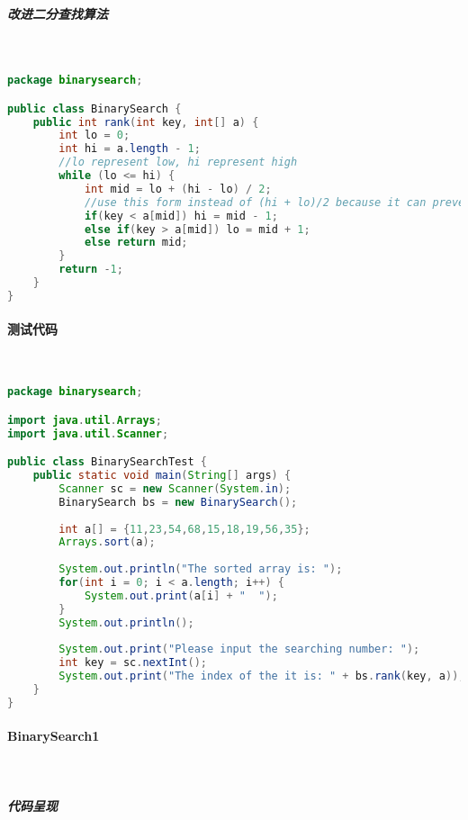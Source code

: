\documentclass[UTF8]{ctexart}
\begin{document}
    \subparagraph{改进二分查找算法}

    ~

\begin{small}
\begin{lstlisting}[language=java]
package binarysearch;

public class BinarySearch {
	public int rank(int key, int[] a) {
        int lo = 0;
        int hi = a.length - 1;
        //lo represent low, hi represent high
        while (lo <= hi) {
            int mid = lo + (hi - lo) / 2;
            //use this form instead of (hi + lo)/2 because it can prevent overflow
            if(key < a[mid]) hi = mid - 1;
            else if(key > a[mid]) lo = mid + 1;
            else return mid;
        }
        return -1;
    }
}
\end{lstlisting}
\end{small}

    \paragraph{测试代码}

    ~

\begin{small}
\begin{lstlisting}[language=java]
package binarysearch;

import java.util.Arrays;
import java.util.Scanner;

public class BinarySearchTest {
	public static void main(String[] args) {
		Scanner sc = new Scanner(System.in);
		BinarySearch bs = new BinarySearch();
		
		int a[] = {11,23,54,68,15,18,19,56,35};
		Arrays.sort(a);
		
		System.out.println("The sorted array is: ");
		for(int i = 0; i < a.length; i++) {
			System.out.print(a[i] + "  ");
		}
		System.out.println();
		
		System.out.print("Please input the searching number: ");
		int key = sc.nextInt();
		System.out.print("The index of the it is: " + bs.rank(key, a));
	}
}
\end{lstlisting}
\end{small}

    \paragraph{BinarySearch1}

    ~

    \subparagraph{代码呈现}
\end{document}
